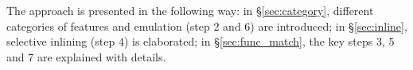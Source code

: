 The approach is presented in the following way: in \S\ref{sec:category}, different categories of features and emulation (step 2 and 6) are introduced; in \S\ref{sec:inline}, selective inlining (step 4) is elaborated; in \S\ref{sec:func_match}, the key steps 3, 5 and 7 are explained with details. %




%
%
%

